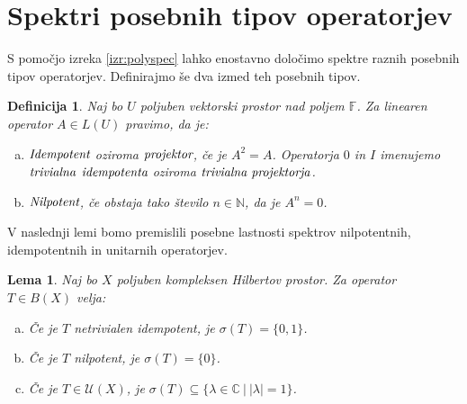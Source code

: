 \documentclass[12pt,a4paper,oneside,fleqn,openany]{book}
\newtheorem{lema}[izrek]{Lema}
\newtheorem{definicija}[izrek]{Definicija}
\newcommand{\F}{\mathbb{F}}
\newcommand{\N}{\mathbb{N}}
\newcommand{\C}{\mathbb{C}}
\newcommand{\abs}[1]{\ensuremath{\lvert #1 \rvert}}
\newcommand{\pojem}[1]{\ensuremath{\emph{#1}}}
\begin{document}
\section[Spektri posebnih tipov operatorjev]{Spektri posebnih tipov operatorjev}

S pomočjo izreka \ref{izr:polyspec} lahko enostavno določimo spektre raznih posebnih tipov operatorjev. Definirajmo še dva izmed teh posebnih tipov.

\begin{definicija}
	\label{def:idemnilop}
	Naj bo $U$ poljuben vektorski prostor nad poljem $\F$. Za linearen operator $A\in L(U)$ pravimo, da je: \begin{enumerate}[a)]
		\item \pojem{Idempotent} oziroma \pojem{projektor}, če je $A^2 = A$. Operatorja $0$ in $I$ imenujemo \pojem{trivialna} \pojem{idempotenta} oziroma \pojem{trivialna projektorja}.
		\item \pojem{Nilpotent}, če obstaja tako število $n\in\N$, da je $A^n = 0$.
	\end{enumerate}
\end{definicija}
V naslednji lemi bomo premislili posebne lastnosti spektrov nilpotentnih, idempotentnih in unitarnih operatorjev.
\begin{lema}
	\label{lem:idenilunispec}
	Naj bo $X$ poljuben kompleksen Hilbertov prostor. Za operator $T\in B(X)$ velja: \begin{enumerate}[a)]
		\item Če je $T$ netrivialen idempotent, je $\sigma(T) = \{0, 1\}$.
		\item Če je $T$ nilpotent, je $\sigma(T) = \{0\}$.
		\item Če je $T\in \mathcal{U}(X)$, je $\sigma(T) \subseteq \{\lambda\in\C~|~ \abs{\lambda}=1\}$.
	\end{enumerate}
\end{lema}
\end{document}
